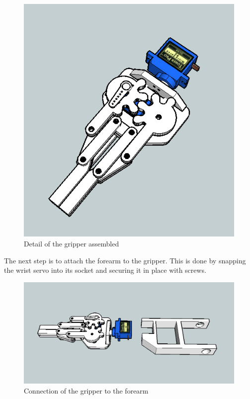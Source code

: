 	\begin{figure}[H]
			\centering
			\includegraphics[scale=0.4]{images/Assembly/2.png}
			\caption{Detail of the gripper assembled}
			\label{ass2}
	\end{figure}
	\bigskip

The next step is to attach the forearm to the gripper. This is done by snapping the wrist servo into its socket and securing it in place with screws.\\

	\begin{figure}[H]
			\centering
			\includegraphics[scale=0.45]{images/Assembly/3.png}
			\caption{Connection of the gripper to the forearm }
			\label{ass3}
	\end{figure}
	\bigskip

